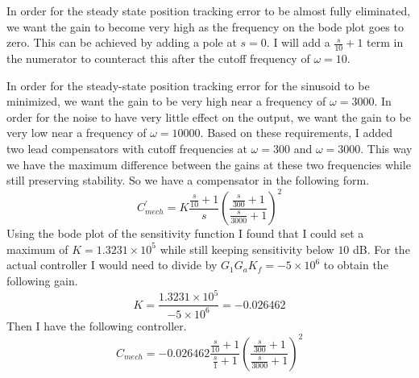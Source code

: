 \documentclass[12pt]{article}
\begin{document}
In order for the steady state position tracking error to be almost fully eliminated, we want the gain to
become very high as the frequency on the bode plot goes to zero. This can be achieved by adding a pole at \(s=0\).
I will add a \(\frac{s}{10}+1\) term in the numerator to counteract this after the cutoff frequency of \(\omega=10\).

In order for the steady-state position tracking error for the sinusoid to be minimized, we want the gain to be very
high near a frequency of \(\omega=3000\). In order for the noise to have very little effect on the output, we want the gain
to be very low near a frequency of \(\omega=10000\). Based on these requirements, I added two lead compensators with
cutoff frequencies at \(\omega=300\) and \(\omega=3000\). This way we have the maximum difference between the gains at these
two frequencies while still preserving stability. So we have a compensator in the following form.
\[C^\prime_{mech}=K\frac{\frac{s}{10}+1}{s}\left(\frac{\frac{s}{300}+1}{\frac{s}{3000}+1}\right)^2\]
Using the bode plot of the sensitivity function I found that I could set a maximum of \(K=1.3231\times 10^5\) while still
keeping sensitivity below \(10\) dB. For the actual controller I would need to divide by \(G_1G_aK_f=-5\times 10^6\) to
obtain the following gain.
\[K=\frac{1.3231\times10^5}{-5\times 10^6}=-0.026462\]
Then I have the following controller.
\[C_{mech}=-0.026462\frac{\frac{s}{10}+1}{\frac{s}{1}+1}\left(\frac{\frac{s}{300}+1}{\frac{s}{3000}+1}\right)^2\]
\end{document}
